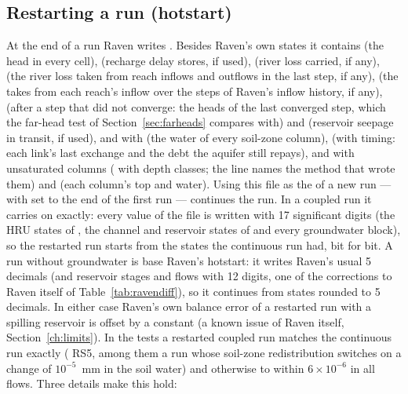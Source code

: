 \subsection{Restarting a run (hotstart)}\label{sec:hotstart}
At the end of a run Raven writes . Besides Raven's own states it contains  (the head in
every cell),  (recharge delay stores, if used),  (river loss carried, if any),
 (the river loss taken from reach inflows and outflows in the last step, if any),
 (the takes from each reach's inflow over the steps of Raven's inflow history, if any), 
(after a step that did not converge: the heads of the last converged step, which the far-head test of
Section~\ref{sec:farheads} compares with) and  (reservoir seepage in
transit, if used), and with   (the water of every soil-zone column), 
(with  timing: each link's last exchange and the debt the aquifer still repays), and with unsaturated columns  ( with depth classes; the line names the  method that wrote them) and  (each column's top and water). Using this file as the  of a new run --- with  set to the end of the first
run --- continues the run. In a coupled run it carries on exactly: every value of the file is written with 17 significant
digits (the HRU states of , the channel and reservoir states of  and
every groundwater block), so the restarted run starts from the states the continuous run had, bit for bit. A run without
groundwater is base Raven's hotstart: it writes Raven's usual 5 decimals (and reservoir stages and flows with 12 digits, one
of the corrections to Raven itself of Table~\ref{tab:ravendiff}), so it continues from states rounded to 5 decimals. In
either case Raven's own balance error of a restarted run with a spilling reservoir is offset by a constant (a known issue
of Raven itself, Section~\ref{ch:limits}). In the tests a restarted coupled run matches the continuous run exactly
( RS5, among them a run whose soil-zone redistribution switches on a change of $10^{-5}$~mm in the
soil water) and otherwise to within $6\times10^{-6}$ in all flows. Three details make this hold:

